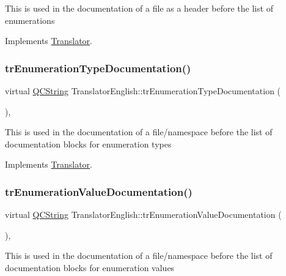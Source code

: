 This is used in the documentation of a file as a header before the list of enumerations 

Implements \mbox{\hyperlink{class_translator}{Translator}}.

\mbox{\label{class_translator_english_ae26962ca11b10e9cb20503dedb8eb635}} 
\subsubsection{\texorpdfstring{trEnumerationTypeDocumentation()}{trEnumerationTypeDocumentation()}}
{\footnotesize\ttfamily virtual \mbox{\hyperlink{class_q_c_string}{Q\+C\+String}} Translator\+English\+::tr\+Enumeration\+Type\+Documentation (\begin{DoxyParamCaption}{ }\end{DoxyParamCaption})\hspace{0.3cm}{\ttfamily [inline]}, {\ttfamily [virtual]}}

This is used in the documentation of a file/namespace before the list of documentation blocks for enumeration types 

Implements \mbox{\hyperlink{class_translator}{Translator}}.

\mbox{\label{class_translator_english_a2830136212dee5a6b0f12b9c9b211fdf}} 
\subsubsection{\texorpdfstring{trEnumerationValueDocumentation()}{trEnumerationValueDocumentation()}}
{\footnotesize\ttfamily virtual \mbox{\hyperlink{class_q_c_string}{Q\+C\+String}} Translator\+English\+::tr\+Enumeration\+Value\+Documentation (\begin{DoxyParamCaption}{ }\end{DoxyParamCaption})\hspace{0.3cm}{\ttfamily [inline]}, {\ttfamily [virtual]}}

This is used in the documentation of a file/namespace before the list of documentation blocks for enumeration values 

